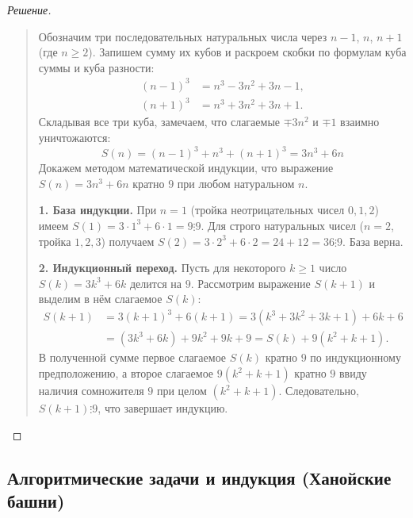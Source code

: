 \begin{proof}[Решение]~\\
    \begin{quote}
        Обозначим три последовательных натуральных числа через $n - 1$, $n$, 
        $n + 1$ (где $n \ge 2$). Запишем сумму их кубов и раскроем скобки по 
        формулам куба суммы и куба разности:
        \begin{align*}
            (n - 1)^3 &= n^3 - 3n^2 + 3n - 1, \\
            (n + 1)^3 &= n^3 + 3n^2 + 3n + 1.
        \end{align*}
        Складывая все три куба, замечаем, что слагаемые $\mp 3n^2$ и 
        $\mp 1$ взаимно уничтожаются:
        \begin{equation} \label{eq:cubes_sum}
            S(n) = (n - 1)^3 + n^3 + (n + 1)^3 = 3n^3 + 6n \tag{5}
        \end{equation}
        Докажем методом математической индукции, что выражение 
        $S(n) = 3n^3 + 6n$ кратно $9$ при любом натуральном $n$.

        \textbf{1. База индукции.} При $n = 1$ (тройка неотрицательных 
        чисел $0, 1, 2$) имеем $S(1) = 3 \cdot 1^3 + 6 \cdot 1 = 9 \vdots 9$. 
        Для строго натуральных чисел ($n = 2$, тройка $1, 2, 3$) получаем 
        $S(2) = 3 \cdot 2^3 + 6 \cdot 2 = 24 + 12 = 36 \vdots 9$. База верна.

        \textbf{2. Индукционный переход.} Пусть для некоторого $k \ge 1$ 
        число $S(k) = 3k^3 + 6k$ делится на $9$. Рассмотрим выражение 
        $S(k + 1)$ и выделим в нём слагаемое $S(k)$:
        \begin{align*}
            S(k + 1) &= 3(k + 1)^3 + 6(k + 1) = 
            3(k^3 + 3k^2 + 3k + 1) + 6k + 6 \\
            &= (3k^3 + 6k) + 9k^2 + 9k + 9 = S(k) + 9(k^2 + k + 1).
        \end{align*}
        В полученной сумме первое слагаемое $S(k)$ кратно $9$ по 
        индукционному предположению, а второе слагаемое $9(k^2 + k + 1)$ 
        кратно $9$ ввиду наличия сомножителя $9$ при целом $(k^2 + k + 1)$. 
        Следовательно, $S(k + 1) \vdots 9$, что завершает индукцию.
    \end{quote}
\end{proof}

\subsection{Алгоритмические задачи и индукция (Ханойские башни)}

